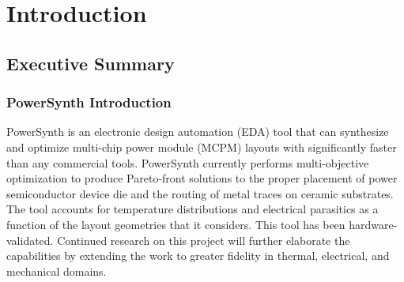 \documentclass[11pt]{article}
\begin{document}
\tableofcontents
\pagebreak

\section{Introduction}
\label{sec-1}

\subsection{Executive Summary}
\label{sec-1-1}
\subsubsection{PowerSynth Introduction}
PowerSynth is an electronic design automation (EDA) tool that can synthesize and optimize multi-chip power module (MCPM) layouts with significantly faster than any commercial tools. PowerSynth currently performs multi-objective optimization to produce Pareto-front solutions to the proper placement of power semiconductor device die and the routing of metal traces on ceramic substrates. The tool accounts for temperature distributions and electrical parasitics as a function of the layout geometries that it considers. This tool has been hardware-validated. Continued research on this project will further elaborate the capabilities by extending the work to greater fidelity in thermal, electrical, and mechanical domains.
\end{document}
